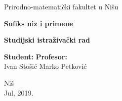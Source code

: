 \begin{titlepage}
\begin{center}
{\large Prirodno-matemati\v cki fakultet u Ni\v su}
\end{center}
\vspace{5cm}
\begin{center}
{\Huge \textbf{Sufiks niz i primene}}
\end{center}
\begin{center}
{\large \textbf{Studijski istra\v ziva\v cki rad}}
\end{center}
\vspace{7cm}
\large \textbf{Student:} \hspace{8.9 cm} \textbf{Profesor:} \\
\large Ivan Sto\v si\' c \hspace{7.6 cm} Marko Petkovi\' c
\vspace{2.5cm}
\begin{center}{Ni\v s\\
Jul, 2019.}\end{center}
\end{titlepage}